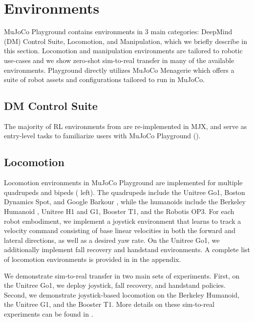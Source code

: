 \section{Environments}

MuJoCo Playground contains environments in 3 main categories: DeepMind (DM) Control Suite,  Locomotion, and Manipulation, which we briefly describe in this section. Locomotion and manipulation environments are tailored to robotic use-cases and we show zero-shot sim-to-real transfer in many of the available environments. Playground directly utilizes MuJoCo Menagerie \cite{menagerie2022github} which offers a suite of robot assets and configurations tailored to run in MuJoCo.



\subsection{DM Control Suite}

The majority of RL environments from \cite{tassa2018deepmind} are re-implemented in MJX, and serve as entry-level tasks to familiarize users with MuJoCo Playground ().




\subsection{Locomotion}

Locomotion environments in MuJoCo Playground are implemented for multiple quadrupeds and bipeds ( left). The quadrupeds include the Unitree Go1, Boston Dynamics Spot, and Google Barkour \cite{caluwaerts2023barkour}, while the humanoids include the Berkeley Humanoid \cite{liao2024berkeley}, Unitree H1 and G1, Booster T1, and the Robotis OP3. For each robot embodiment, we implement a joystick environment that learns to track a velocity command consisting of base linear velocities in both the forward and lateral directions, as well as a desired yaw rate. On the Unitree Go1, we additionally implement fall recovery and handstand environments. A complete list of locomotion environments is provided in  in the appendix.

We demonstrate sim-to-real transfer in two main sets of experiments. First, on the Unitree Go1, we deploy joystick, fall recovery, and handstand policies. Second, we demonstrate joystick-based locomotion on the Berkeley Humanoid, the Unitree G1, and the Booster T1. More details on these sim-to-real experiments can be found in .

